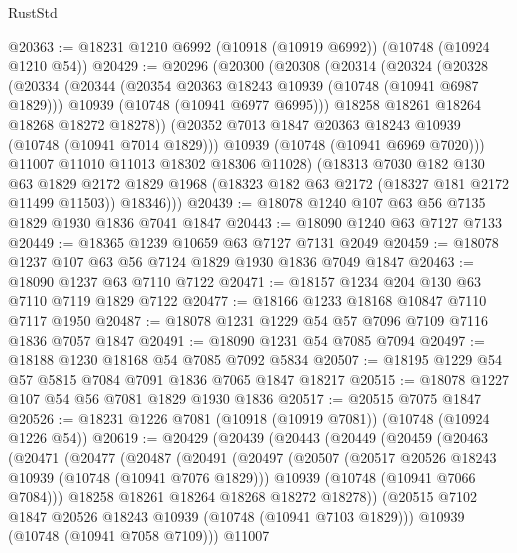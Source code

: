 \begin{lexlean}{RustStd}
\begin{coremodule}
{\begin{coremodule}
{{{{{@20363 := @18231 @1210 @6992 (@10918 (@10919 @6992)) (@10748 (@10924 @1210 @54))
@20429 := @20296
    (@20300
      (@20308
        (@20314
          (@20324
            (@20328
              (@20334
                (@20344
                  (@20354 @20363 @18243 @10939 (@10748 (@10941 @6987 @1829)))
                  @10939
                  (@10748 (@10941 @6977 @6995)))
                @18258
                @18261
                @18264
                @18268
                @18272
                @18278))
            (@20352 @7013 @1847 @20363 @18243 @10939 (@10748 (@10941 @7014 @1829)))
            @10939
            (@10748 (@10941 @6969 @7020)))
          @11007
          @11010
          @11013
          @18302
          @18306
          @11028)
        (@18313
          @7030
          @182
          @130
          @63
          @1829
          @2172
          @1829
          @1968
          (@18323 @182 @63 @2172 (@18327 @181 @2172 @11499 @11503))
          @18346)))
@20439 := @18078 @1240 @107 @63 @56 @7135 @1829 @1930 @1836 @7041 @1847
@20443 := @18090 @1240 @63 @7127 @7133
@20449 := @18365 @1239 @10659 @63 @7127 @7131 @2049
@20459 := @18078 @1237 @107 @63 @56 @7124 @1829 @1930 @1836 @7049 @1847
@20463 := @18090 @1237 @63 @7110 @7122
@20471 := @18157 @1234 @204 @130 @63 @7110 @7119 @1829 @7122
@20477 := @18166 @1233 @18168 @10847 @7110 @7117 @1950
@20487 := @18078 @1231 @1229 @54 @57 @7096 @7109 @7116 @1836 @7057 @1847
@20491 := @18090 @1231 @54 @7085 @7094
@20497 := @18188 @1230 @18168 @54 @7085 @7092 @5834
@20507 := @18195 @1229 @54 @57 @5815 @7084 @7091 @1836 @7065 @1847 @18217
@20515 := @18078 @1227 @107 @54 @56 @7081 @1829 @1930 @1836
@20517 := @20515 @7075 @1847
@20526 := @18231 @1226 @7081 (@10918 (@10919 @7081)) (@10748 (@10924 @1226 @54))
@20619 := @20429
    (@20439
      (@20443
        (@20449
          (@20459
            (@20463
              (@20471
                (@20477
                  (@20487
                    (@20491
                      (@20497
                        (@20507
                          (@20517 @20526 @18243 @10939 (@10748 (@10941 @7076 @1829)))
                          @10939
                          (@10748 (@10941 @7066 @7084)))
                        @18258
                        @18261
                        @18264
                        @18268
                        @18272
                        @18278))
                    (@20515 @7102 @1847 @20526 @18243 @10939 (@10748 (@10941 @7103 @1829)))
                    @10939
                    (@10748 (@10941 @7058 @7109)))
                  @11007
}}}}}
\end{coremodule}}
\end{coremodule}
\end{lexlean}

